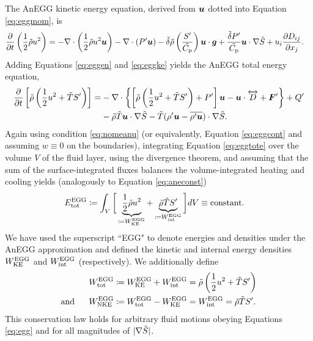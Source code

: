 \documentclass[12pt]{article}
\newcommand{\vecf}{\bm{F}}
\newcommand{\eggetot}{E_{\rm tot}^{\rm EGG}}
\newcommand{\eggwtot}{W^{\rm EGG}_{\rm tot}}
\newcommand{\eggwke}{W^{\rm EGG}_{\rm KE}}
\newcommand{\eggwnke}{W^{\rm EGG}_{\rm NKE}}
\newcommand{\eggwint}{W^{\rm EGG}_{\rm int}}
\begin{document}
The AnEGG kinetic energy equation, derived from $\bm{u}$ dotted into Equation \eqref{eq:eggmom}, is 
	\begin{align}\label{eq:eggke}
	\frac{\partial}{\partial t}\left(\frac{1}{2}\tilde{\rho} u^2\right)&=-\nabla\cdot\left(\frac{1}{2}\tilde{\rho} u^2\bm{u} \right) - \nabla\cdot({P^\prime}\bm{u})  - \tilde{\delta} \tilde{\rho} \left(\frac{{S^\prime}}{\tilde{C_{\rm{p}}}}\right) \bm{u}\cdot \bm{g} +\frac{\tilde{\delta}  {P^\prime}}{\tilde{C_{\rm{p}}}} \bm{u}\cdot \nabla\tilde{S}  + u_i\frac{\partial D_{ij}}{\partial x_j}.
	\end{align}
Adding Equations \eqref{eq:eggen} and \eqref{eq:eggke} yields the AnEGG total energy equation,
\begin{align}\label{eq:eggtote}
	\pderiv{}{t}\left[\rhotilde\left(\frac{1}{2} u^2 + \tmptilde \entrprime \right)\right] = &-\Div\left\{\left[\rhotilde\left(\frac{1}{2} u^2 + \tmptilde \entrprime\right) + \prsprime \right]\vecu- \vecu\cdot\overleftrightarrow{D} + \vecf^\prime \right\} + Q^\prime \nonumber\\ & -\rhotilde\tmptilde\ugrad\entrtilde- \tmptilde(\rhoprime \vecu-\overline{\rhoprime\vecu})\cdot\nabla\entrtilde. 
\end{align}
Again using condition \eqref{eq:nomeanu} (or equivalently, Equation \eqref{eq:eggcont} and assuming $w\equiv0$ on the boundaries), integrating Equation \eqref{eq:eggtote} over the volume $V$ of the fluid layer, using the divergence theorem, and assuming that the sum of the surface-integrated fluxes balances the volume-integrated heating and cooling yields (analogously to Equation \eqref{eq:aneconst})
\begin{align}\label{eq:eggeconst}
	\eggetot &\define \int_V \bigg{[}  \underbrace{\frac{1}{2}\rhotilde u^2}_{\define \eggwke} + \underbrace{\rhotilde \tmptilde \entrprime}_{\define\eggwint} \bigg{]} dV \equiv \text{constant}.
\end{align}
We have used the superscript ``EGG" to denote energies and densities under the AnEGG approximation and defined the kinetic and internal energy densities $\eggwke$ and $\eggwint$ (respectively). We additionally define
\begin{subequations}\label{eq:eggwtotnke}
	\begin{align}
		\eggwtot &\define \eggwke + \eggwint = \rhotilde\left(\frac{1}{2}u^2 + \tmptilde\entrprime\right)\label{eq:eggwtot}\\
		\andd \eggwnke &\define \eggwtot - \eggwke = \eggwint =\rhotilde \tmptilde \entrprime.\label{eq:eggwnke}
	\end{align}
\end{subequations}
This conservation law holds for arbitrary fluid motions obeying Equations \eqref{eq:egg} and for all magnitudes of $|\nabla\tilde{S}|$. 
\end{document}
